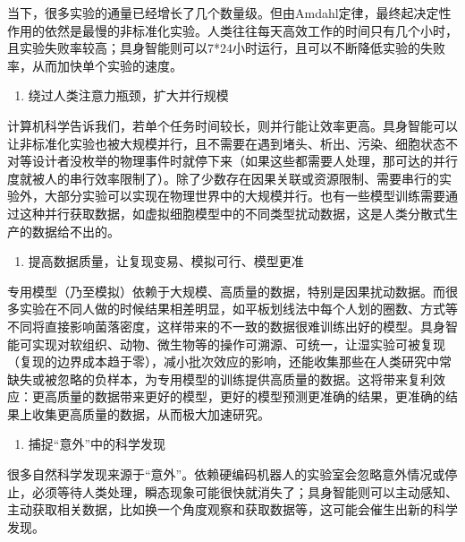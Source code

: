 当下，很多实验的通量已经增长了几个数量级。但由Amdahl定律，最终起决定性作用的依然是最慢的非标准化实验。人类往往每天高效工作的时间只有几个小时，且实验失败率较高；具身智能则可以7*24小时运行，且可以不断降低实验的失败率，从而加快单个实验的速度。

\begin{enumerate}
\def\labelenumi{\arabic{enumi}.}
\setcounter{enumi}{2}
\tightlist
\item
  绕过人类注意力瓶颈，扩大并行规模
\end{enumerate}

计算机科学告诉我们，若单个任务时间较长，则并行能让效率更高。具身智能可以让非标准化实验也被大规模并行，且不需要在遇到堵头、析出、污染、细胞状态不对等设计者没枚举的物理事件时就停下来（如果这些都需要人处理，那可达的并行度就被人的串行效率限制了）。除了少数存在因果关联或资源限制、需要串行的实验外，大部分实验可以实现在物理世界中的大规模并行。也有一些模型训练需要通过这种并行获取数据，如虚拟细胞模型中的不同类型扰动数据，这是人类分散式生产的数据给不出的。

\begin{enumerate}
\def\labelenumi{\arabic{enumi}.}
\setcounter{enumi}{3}
\tightlist
\item
  提高数据质量，让复现变易、模拟可行、模型更准
\end{enumerate}

专用模型（乃至模拟）依赖于大规模、高质量的数据，特别是因果扰动数据。而很多实验在不同人做的时候结果相差明显，如平板划线法中每个人划的圈数、方式等不同将直接影响菌落密度，这样带来的不一致的数据很难训练出好的模型。具身智能可实现对软组织、动物、微生物等的操作可溯源、可统一，让湿实验可被复现（复现的边界成本趋于零），减小批次效应的影响，还能收集那些在人类研究中常缺失或被忽略的负样本，为专用模型的训练提供高质量的数据。这将带来复利效应：更高质量的数据带来更好的模型，更好的模型预测更准确的结果，更准确的结果上收集更高质量的数据，从而极大加速研究。

\begin{enumerate}
\def\labelenumi{\arabic{enumi}.}
\setcounter{enumi}{4}
\tightlist
\item
  捕捉``意外''中的科学发现
\end{enumerate}

很多自然科学发现来源于``意外''。依赖硬编码机器人的实验室会忽略意外情况或停止，必须等待人类处理，瞬态现象可能很快就消失了；具身智能则可以主动感知、主动获取相关数据，比如换一个角度观察和获取数据等，这可能会催生出新的科学发现。

